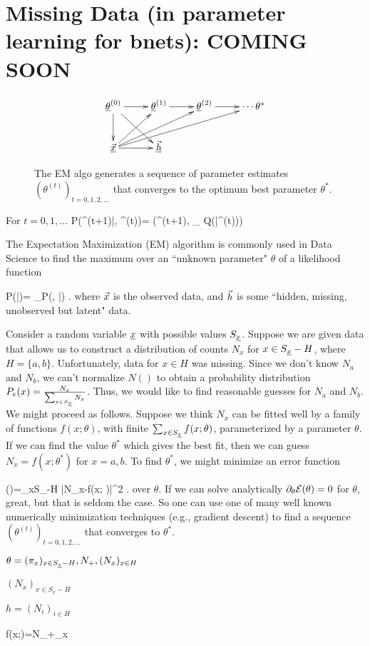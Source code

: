 \chapter{Missing Data
 (in parameter learning for bnets): COMING SOON}
\label{ch-missing-d}


\begin{figure}[h!]
$$\xymatrix{
\ul{\theta}^{(0)}\ar[d]\ar[dr]\ar[r]
&\ul{\theta}^{(1)}\ar[r]
&\ul{\theta}^{(2)}\ar[r]
&\cdots\theta^*
\\
\ul{\vecx}\ar[r]\ar[ru]\ar[rru]\ar[urrr]
&\ul{\vech}
}$$
\caption{
The EM algo generates 
a sequence of 
parameter estimates 
$(\theta^{(t)})_{t=0, 1,2, \ldots}$
that converges to the optimum
best parameter $\theta^*$.
}
\label{fig-emax-dynamical-bnet}
\end{figure}

For $t=0, 1, \ldots$
\beq\color{blue}
P(\theta^{(t+1)}|\vecx, \theta^{(t)})=
\delta(\theta^{(t+1)}, \argmax_\theta
 Q(\theta|\theta^{(t)}))
\eeq

The Expectation Maximization (EM) 
algorithm 
is commonly used in Data Science 
to find the maximum
over an ``unknown parameter" $\theta$ of a
 likelihood function 

\beq
P(\vecx|\theta)=
\sum_\vech P(\vecx, \vech|\theta)
\;.
\eeq
where ${\vec{x}}$
is the observed data,
and ${\vec{h}}$ is some ``hidden, missing, 
unobserved but latent"
data.

Consider a random variable ${\underline{x}}$
with possible values $S_{\underline{x}}$.
Suppose we are given
data that allows us to construct
a distribution of counts
$N_x$
for $x\in S_{\underline{x}}-H$,
where $H=\{a,b\}$.
Unfortunately,
 data for $x\in H$
was missing.
Since we don't 
know $N_a$
and $N_b$,
we can't normalize
$N()$ to obtain
a probability distribution
$P_e(x)=\frac{N_x}
{\sum_{x\in S_{\underline{x}}}N_x}$.
Thus, we would
like to find 
reasonable guesses for $N_a$
and $N_b$.
We might proceed as follows.
Suppose we think
$N_x$ 
can be fitted well by
a family
of functions
$f(x;\theta)$,
with finite $\sum_{x\in S_{\underline{x}}}f(x;\theta)$,
parameterized by
a parameter $\theta$.
If we can find
the value $\theta^*$
which
gives the best fit,
then we can 
guess $N_x=f(x; \theta^*)$
for $x=a,b$.
To find $\theta^*$,
we might minimize
an error function

\beq
\cale(\theta)=\sum_{x\in S_\rvx-H}
|N_x-f(x; \theta)|^2
\;.
\eeq
over $\theta$.
If we can
solve analytically
$\partial_\theta {\cal E}(\theta)=0$
for $\theta$,
great, but that is seldom the case.
So one can use one
of many
well
known numerically
minimization
techniques (e.g., 
gradient descent)
to find 
a sequence
$(\theta^{(t)})_{t=0, 1, 2, \ldots}$
that converges to $\theta^*$.


$\theta= (\pi_x)_{x\in S_{\underline{x}}-H}, N_+, (N_x)_{x\in H}$

$(N_x)_{x\in S_x-H}$

$h=(N_i)_{i\in H}$

\beq
f(x;\theta)=N_+\pi_x
\eeq

